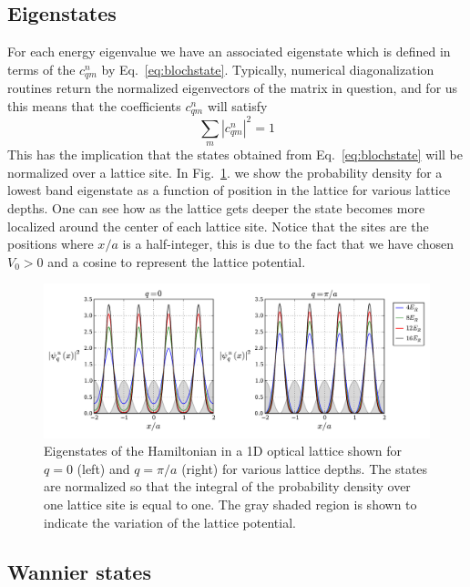 \documentclass[11pt,letter]{article}
\newcommand{\vo}{\ensuremath{V_{0}}}
\begin{document}
\subsection{Eigenstates}
For each energy eigenvalue we have
an associated eigenstate  which is defined in terms of the
$c_{qm}^{n}$ by Eq.~\ref{eq:blochstate}.   Typically, numerical diagonalization routines return the normalized eigenvectors of the matrix in question,  and for us this means that the coefficients $c_{qm}^{n}$ will satisfy
\begin{equation}
   \sum_{m} | c_{qm}^{n} |^{2} = 1 
\end{equation} 
This has the implication that the states obtained from Eq.~\ref{eq:blochstate} will be normalized over a lattice site.  In Fig.~\ref{fig:eigenfuns1d}. we
show the probability density for a lowest band eigenstate as a function of
position in the lattice for various lattice depths.  One can see how as the
lattice gets deeper the state becomes more localized around the center of each
lattice site. Notice that the sites are the positions where $x/a$ is a half-integer, this is due to the fact that we have chosen $\vo>0$ and a cosine to represent the lattice potential.  
\begin{figure}
\centering \includegraphics[width=\textwidth]{../BandStructure_figures/eigenfuns1d.pdf}
\caption[Eigenstates in 1D lattice.]{\small Eigenstates of the Hamiltonian in a 1D optical lattice shown for $q=0$ (left) and $q=\pi/a$ (right) for various lattice depths. The states are normalized so that the integral of the probability density over one lattice site is equal to one.  The gray shaded region is shown to indicate the variation of the lattice potential. }
\label{fig:eigenfuns1d}
\end{figure}

\subsection{Wannier states} 
\label{sec:1Dlattice}
\end{document}
